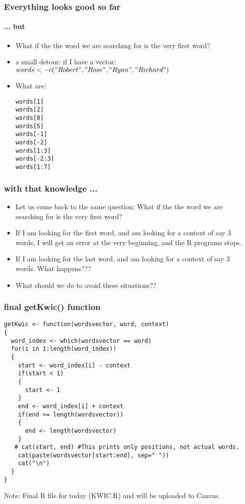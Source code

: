 \documentclass{beamer}
\begin{document}
\begin{frame}[fragile]
\frametitle{Everything looks good so far}
\framesubtitle{... but}
\begin{itemize}
\item What if the the word we are searching for is the very first word? \pause
\item a small detour: if I have a vector: 
\\ $words <- c("Robert", "Rose", "Ryan", "Richard")$
\item What are:
\footnotesize
\begin{verbatim} 
words[1]
words[2]
words[0]
words[5]
words[-1]
words[-2]
words[1:3]
words[-2:3]
words[1:7]
\end{verbatim} 
\end{itemize}
\end{frame}

\begin{frame}
\frametitle{with that knowledge ...}
\begin{itemize}
\item Let us come back to the same question: What if the the word we are searching for is the very first word? \pause
\item If I am looking for the first word, and am looking for a context of say 3 words, I will get an error at the very beginning, and the R programs stops.
\item If I am looking for the last word, and am looking for a context of say 3 words. What happens???
\item What should we do to avoid these situations??
\end{itemize}
\end{frame}

\begin{frame}[fragile]
\frametitle{final getKwic() function}
\footnotesize
\begin{verbatim}
getKwic <- function(wordsvector, word, context)
{
  word_index <- which(wordsvector == word)
  for(i in 1:length(word_index)) 
  {
    start <- word_index[i] - context
    if(start < 1)
    {
      start <- 1
    }
    end <- word_index[i] + context
    if(end >= length(wordsvector)) 
    {
      end <- length(wordsvector)
    }
   # cat(start, end) #This prints only positions, not actual words.
    cat(paste(wordsvector[start:end], sep=" ")) 
    cat("\n")
  }
}
\end{verbatim}
Note: Final R file for today (KWIC.R) and will be uploaded to Canvas.
\end{frame}
\end{document}

